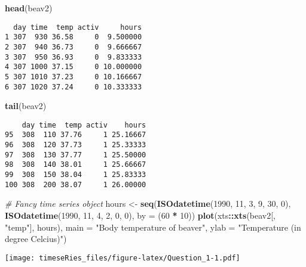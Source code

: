 \documentclass[]{book}
\newenvironment{Shaded}{\begin{snugshade}}{\end{snugshade}}
\newcommand{\CommentTok}[1]{\textcolor[rgb]{0.56,0.35,0.01}{\textit{#1}}}
\newcommand{\DataTypeTok}[1]{\textcolor[rgb]{0.13,0.29,0.53}{#1}}
\newcommand{\DecValTok}[1]{\textcolor[rgb]{0.00,0.00,0.81}{#1}}
\newcommand{\KeywordTok}[1]{\textcolor[rgb]{0.13,0.29,0.53}{\textbf{#1}}}
\newcommand{\NormalTok}[1]{#1}
\newcommand{\OperatorTok}[1]{\textcolor[rgb]{0.81,0.36,0.00}{\textbf{#1}}}
\newcommand{\StringTok}[1]{\textcolor[rgb]{0.31,0.60,0.02}{#1}}
\begin{document}
\begin{Shaded}
\begin{Highlighting}[]
\KeywordTok{head}\NormalTok{(beav2)}
\end{Highlighting}
\end{Shaded}

\begin{verbatim}
  day time  temp activ     hours
1 307  930 36.58     0  9.500000
2 307  940 36.73     0  9.666667
3 307  950 36.93     0  9.833333
4 307 1000 37.15     0 10.000000
5 307 1010 37.23     0 10.166667
6 307 1020 37.24     0 10.333333
\end{verbatim}

\begin{Shaded}
\begin{Highlighting}[]
\KeywordTok{tail}\NormalTok{(beav2)}
\end{Highlighting}
\end{Shaded}

\begin{verbatim}
    day time  temp activ    hours
95  308  110 37.76     1 25.16667
96  308  120 37.73     1 25.33333
97  308  130 37.77     1 25.50000
98  308  140 38.01     1 25.66667
99  308  150 38.04     1 25.83333
100 308  200 38.07     1 26.00000
\end{verbatim}

\begin{Shaded}
\begin{Highlighting}[]
\CommentTok{# Fancy time series object}
\NormalTok{hours <-}\StringTok{ }\KeywordTok{seq}\NormalTok{(}\KeywordTok{ISOdatetime}\NormalTok{(}\DecValTok{1990}\NormalTok{, }\DecValTok{11}\NormalTok{, }\DecValTok{3}\NormalTok{, }\DecValTok{9}\NormalTok{, }\DecValTok{30}\NormalTok{, }\DecValTok{0}\NormalTok{), }\KeywordTok{ISOdatetime}\NormalTok{(}\DecValTok{1990}\NormalTok{, }\DecValTok{11}\NormalTok{, }\DecValTok{4}\NormalTok{, }\DecValTok{2}\NormalTok{, }
    \DecValTok{0}\NormalTok{, }\DecValTok{0}\NormalTok{), }\DataTypeTok{by =}\NormalTok{ (}\DecValTok{60} \OperatorTok{*}\StringTok{ }\DecValTok{10}\NormalTok{))}
\KeywordTok{plot}\NormalTok{(xts}\OperatorTok{::}\KeywordTok{xts}\NormalTok{(beav2[, }\StringTok{"temp"}\NormalTok{], hours), }\DataTypeTok{main =} \StringTok{"Body temperature of beaver"}\NormalTok{, }
    \DataTypeTok{ylab =} \StringTok{"Temperature (in degree Celcius)"}\NormalTok{)}
\end{Highlighting}
\end{Shaded}

\texttt{[image: timeseRies\_files/figure-latex/Question\_1-1.pdf]}
\end{document}
